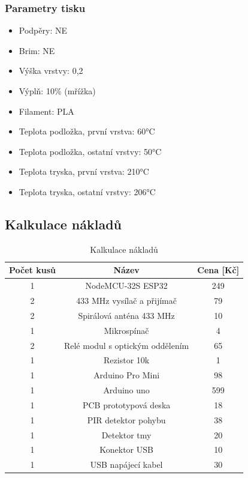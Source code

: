 \documentclass[11pt,a4paper,twoside,openright]{report}
\begin{document}
	\subsubsection{Parametry tisku}
	\begin{itemize}
		\item Podpěry: NE
		\item Brim: NE
		\item Výška vrstvy: 0,2
		\item Výplň: 10\% (mřížka)
		\item Filament: PLA
		\item Teplota podložka, první vrstva: 60°C
		\item Teplota podložka, ostatní vrstvy: 50°C
		\item Teplota tryska, první vrstva: 210°C
		\item Teplota tryska, ostatní vrstvy: 206°C
	\end{itemize}
	
	\subsection{Kalkulace nákladů}
	
	\begin{table}[htb]
		\centering
		\begin{tabular}{|c|c|c|}
			\hline
			Počet kusů & Název & Cena [Kč] \\
			\hline
			1 & NodeMCU-32S ESP32 & 249  \\
			\hline
			2 & 433 MHz vysílač a přijímač & 79 \\
			\hline
			2 & Spirálová anténa 433 MHz & 10 \\
			\hline
			1 & Mikrospínač & 4 \\
			\hline
			2 & Relé modul s optickým oddělením & 65 \\
			\hline
			1 & Rezistor 10k & 1 \\
			\hline
			1 & Arduino Pro Mini & 98 \\
			\hline
			1 & Arduino uno & 599 \\
			\hline
			1 & PCB prototypová deska & 18 \\
			\hline
			1 & PIR detektor pohybu & 38 \\
			\hline
			1 & Detektor tmy & 20 \\
			\hline
			1 & Konektor USB & 10 \\
			\hline
			1 & USB napájecí kabel & 30 \\
			\hline
		\end{tabular}
		\caption{Kalkulace nákladů}
	\end{table}
	
\end{document}
